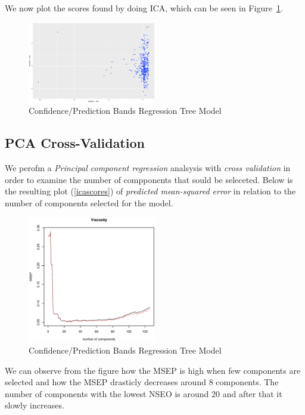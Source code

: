 \documentclass[a4paper, twocolumn]{article}
\begin{document}
        We now plot the scores found by doing ICA, which can be seen in Figure~\ref{fig:icascores}.

        \begin{figure}[h!]
            \centering
            \caption{Confidence/Prediction Bands Regression Tree Model}
            \label{fig:icascores}
            \includegraphics[width=0.5\textwidth]{share/A2_icascore.eps}
        \end{figure}

    \subsection*{PCA Cross-Validation}

 		We perofm a \emph{Principal component regression} analsysis with \emph{cross validation} in order to examine the number of compponents that sould be seleceted. Below is the resulting plot (\ref{icascores}) of \emph{predicted mean-squared error} in relation to the number of components selected for the model.

        \begin{figure}[h!]
            \centering
            \caption{Confidence/Prediction Bands Regression Tree Model}
            \label{fig:viscosity}
            \includegraphics[width=0.5\textwidth]{share/A2_viscosity.eps}
        \end{figure}

	We can observe from the figure how the MSEP is high when few components are selected and how the MSEP drasticly decreases around 8 components. The number of components with the lowest NSEO is around 20 and after that it slowly increases.
	
\end{document}
